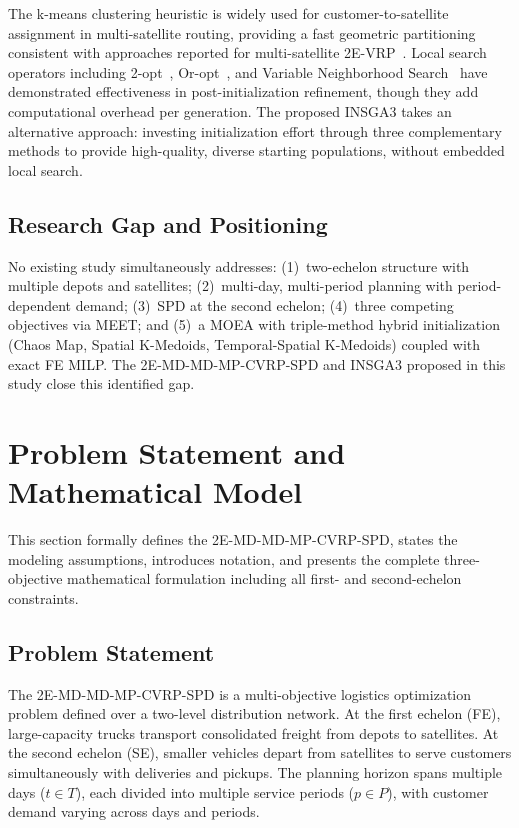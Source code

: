 \documentclass[11pt, a4paper]{article}
\numberwithin{equation}{section}
\begin{document}
The k-means clustering heuristic is widely used for customer-to-satellite
assignment in multi-satellite routing, providing a fast geometric partitioning
consistent with approaches reported for multi-satellite
2E-VRP~\cite{wang2021,wang2023}.
Local search operators including 2-opt~\cite{lin1965}, Or-opt~\cite{or1976},
and Variable Neighborhood Search~\cite{hansen2001} have demonstrated
effectiveness in post-initialization refinement, though they add computational
overhead per generation.  The proposed INSGA3 takes an alternative approach:
investing initialization effort through three complementary methods to provide
high-quality, diverse starting populations, without embedded local search.

\subsection{Research Gap and Positioning}

No existing study simultaneously addresses:
(1)~two-echelon structure with multiple depots and satellites; (2)~multi-day,
multi-period planning with period-dependent demand; (3)~SPD at the second
echelon; (4)~three competing objectives via MEET; and (5)~a MOEA with
triple-method hybrid initialization (Chaos Map, Spatial K-Medoids,
Temporal-Spatial K-Medoids) coupled with exact FE MILP\@.  The
2E-MD-MD-MP-CVRP-SPD and INSGA3 proposed in this study close this identified
gap.

\section{Problem Statement and Mathematical Model}
\label{sec:model}

This section formally defines the 2E-MD-MD-MP-CVRP-SPD, states the modeling
assumptions, introduces notation, and presents the complete three-objective
mathematical formulation including all first- and second-echelon constraints.

\subsection{Problem Statement}

The 2E-MD-MD-MP-CVRP-SPD is a multi-objective logistics optimization problem
defined over a two-level distribution network.  At the first echelon (FE),
large-capacity trucks transport consolidated freight from depots to satellites.
At the second echelon (SE), smaller vehicles depart from satellites to serve
customers simultaneously with deliveries and pickups.  The planning horizon
spans multiple days ($t\in T$), each divided into multiple service periods
($p\in P$), with customer demand varying across days and periods.
\end{document}

